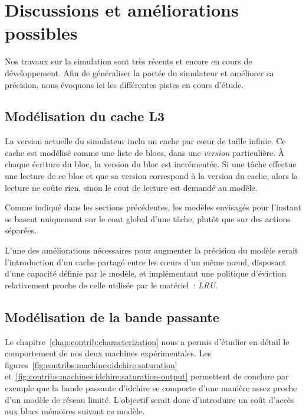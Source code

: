 

\section{Discussions et améliorations possibles}\label{sec:simulation:next}

Nos travaux sur la simulation sont très récents et encore en cours de développement.
Afin de généraliser la portée du simulateur et améliorer sa précision, nous évoquons ici les différentes pistes en cours d'étude.

\subsection{Modélisation du cache L3}

La version actuelle du simulateur inclu un cache par cœur de taille infinie.
Ce cache est modélisé comme une liste de blocs, dans une \emph{version} particulière.
À chaque écriture du bloc, la version du bloc est incrémentée.
Si une tâche effectue une lecture de ce bloc et que sa version correspond à la version du cache, alors la lecture ne coûte rien, sinon le cout de lecture est demandé au modèle.

Comme indiqué dans les sections précédentes, les modèles envisagés pour l'instant se basent uniquement sur le cout global d'une tâche, plutôt que sur des actions séparées.

L'une des améliorations nécessaires pour augmenter la précision du modèle serait l'introduction d'un cache partagé entre les cœurs d'un même nœud, disposant d'une capacité définie par le modèle, et implémentant une politique d'éviction relativement proche de celle utilisée par le matériel~: \emph{LRU}.

\subsection{Modélisation de la bande passante}

Le chapitre~\ref{chap:contrib:characterization} nous a permis d'étudier en détail le comportement de nos deux machines expérimentales.
Les figures~\ref{fig:contribs:machines:idchire:saturation} et~\ref{fig:contribs:machines:idchire:saturation-output} permettent de conclure par exemple que la bande passante d'idchire se comporte d'une manière assez proche d'un modèle de réseau limité.
L'objectif serait donc d'introduire un coût d'accès aux blocs mémoires suivant ce modèle.

